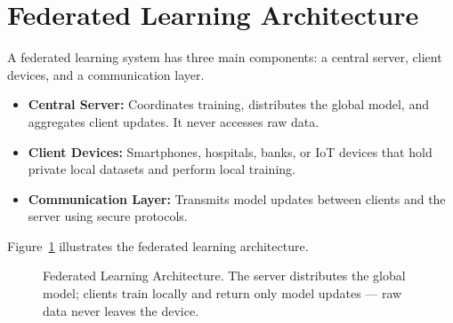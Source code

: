 \documentclass[conference]{IEEEtran}
\begin{document}
\section{Federated Learning Architecture}

A federated learning system has three main components: a central server, client devices, and a communication layer.

\begin{itemize}
    \item \textbf{Central Server:} Coordinates training, distributes the global model, and aggregates client updates. It never accesses raw data.
    \item \textbf{Client Devices:} Smartphones, hospitals, banks, or IoT devices that hold private local datasets and perform local training.
    \item \textbf{Communication Layer:} Transmits model updates between clients and the server using secure protocols.
\end{itemize}

Figure~\ref{fig:architecture} illustrates the federated learning architecture.

\begin{figure}[H]
\centering
{}
\caption{Federated Learning Architecture. The server distributes the global model; clients train locally and return only model updates — raw data never leaves the device.}
\label{fig:architecture}
\end{figure}
\end{document}
